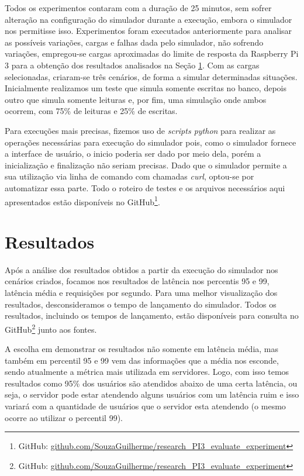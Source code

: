 \documentclass[12pt,english,brazil]{article}
\begin{document}
Todos os experimentos contaram com a duração de 25 minutos, sem sofrer alteração na configuração do simulador durante a execução, embora o simulador nos permitisse isso. Experimentos foram executados anteriormente para analisar as possíveis variações, cargas e falhas dada pelo simulador, não sofrendo variações, empregou-se cargas aproximadas do limite de resposta da Raspberry Pi 3 para a obtenção dos resultados analisados na Seção \ref{sec:Resultados}. Com as cargas selecionadas, criaram-se três cenários, de forma a simular determinadas situações. Inicialmente realizamos um teste que simula somente escritas no banco, depois outro que simula somente leituras e, por fim, uma simulação onde ambos ocorrem, com 75\% de leituras e 25\% de escritas.

Para execuções mais precisas, fizemos uso de \textit{scripts python} para realizar as operações necessárias para execução do simulador pois, como o simulador fornece a interface de usuário, o inicio poderia ser dado por meio dela, porém a inicialização e finalização não seriam precisas. Dado que o simulador permite a sua utilização via linha de comando com chamadas \textit{curl}, optou-se por automatizar essa parte. Todo o roteiro de testes e os arquivos necessários aqui apresentados estão disponíveis no GitHub\footnote{GitHub: \url{github.com/SouzaGuilherme/research\_PI3\_evaluate\_experiment}}.

\section{Resultados} \label{sec:Resultados}

Após a análise dos resultados obtidos a partir da execução do simulador nos cenários criados, focamos nos resultados de latência nos percentis 95 e 99, latência média e requisições por segundo. Para uma melhor visualização dos resultados, desconsideramos o tempo de lançamento do simulador. Todos os resultados, incluindo os tempos de lançamento, estão disponíveis para consulta no GitHub\footnote{GitHub: \url{github.com/SouzaGuilherme/research_PI3_evaluate_experiment}} junto aos fontes.

A escolha em demonstrar os resultados não somente em latência média, mas também em percentil 95 e 99 vem das informações que a média nos esconde, sendo atualmente a métrica mais utilizada em servidores. Logo, com isso temos resultados como 95\% dos usuários são atendidos abaixo de uma certa latência, ou seja, o servidor pode estar atendendo alguns usuários com um latência ruim e isso variará com a quantidade de usuários que o servidor esta atendendo (o mesmo ocorre ao utilizar o percentil 99).
\end{document}
